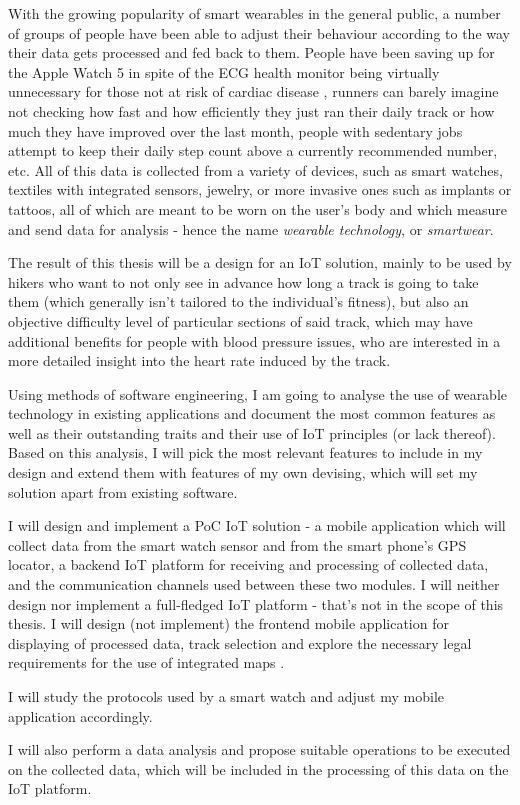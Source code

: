 \linebreak
With the growing popularity of smart wearables in the general public, a number of groups of people have been able to adjust their behaviour according to the way their data gets processed and fed back to them.
People have been saving up for the Apple Watch 5 \cite{AppleWatch5} in spite of the ECG health monitor being virtually unnecessary for those not at risk of cardiac disease \cite{ecg-screening},
runners can barely imagine not checking how fast and how efficiently they just ran their daily track or how much they have improved over the last month,
people with sedentary jobs attempt to keep their daily step count above a currently recommended number, etc.
All of this data is collected from a variety of devices, such as smart watches, textiles with integrated sensors, jewelry, or more invasive ones such as implants or tattoos, all of which are meant to be worn on the user's body and which measure and send data for analysis - hence the name \textit{wearable technology}, or \textit{smartwear}.\cite{what-is-wearable-tech}

The result of this thesis will be a design for an IoT solution, mainly to be used by hikers who want to not only see in advance how long a track is going to take them (which generally isn't tailored to the individual's fitness),
but also an objective difficulty level of particular sections of said track, which may have additional benefits for people with blood pressure issues, who are interested in a more detailed insight into the heart rate induced by the track.

Using methods of software engineering, I am going to analyse the use of wearable technology in existing applications and document the most common features as well as their outstanding traits and their use of IoT principles (or lack thereof).
Based on this analysis, I will pick the most relevant features to include in my design and extend them with features of my own devising, which will set my solution apart from existing software.

I will design and implement a PoC IoT solution - a mobile application which will collect data from the smart watch sensor and from the smart phone's GPS locator, a backend IoT platform for receiving and processing of collected data, and the communication channels used between these two modules.
I will neither design nor implement a full-fledged IoT platform - that's not in the scope of this thesis.
I will design (not implement) the frontend mobile application for displaying of processed data, track selection and explore the necessary legal requirements for the use of integrated maps .

I will study the protocols used by a smart watch  and adjust my mobile application accordingly.

I will also perform a data analysis and propose suitable operations to be executed on the collected data, which will be included in the processing of this data on the IoT platform.


